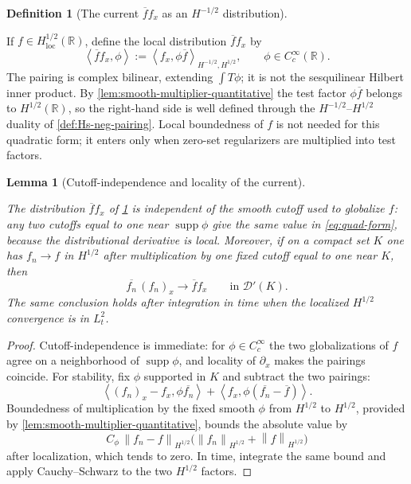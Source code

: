 \documentclass[11pt,oneside]{book}
\providecommand{\uses}[1]{}
\newtheorem{lemma}[theorem]{Lemma}
\theoremstyle{definition}
\newtheorem{definition}[theorem]{Definition}
\theoremstyle{remark}
\newcommand{\R}{\mathbb R}
\newcommand{\D}{\mathcal D}
\newcommand{\1}{\mathbf 1}
\newcommand{\loc}{\mathrm{loc}}
\newcommand{\norm}[1]{\left\lVert #1\right\rVert}
\newcommand{\pair}[2]{\left\langle #1,#2\right\rangle}
\begin{document}
\begin{definition}[The current $\overline f f_x$ as an $H^{-1/2}$ distribution]\label{def:quadratic-form-current}
\uses{def:Hs-neg-pairing, def:multiplier-test-algebra, def:Hs-loc}
If $f\in H^{1/2}_{\loc}(\R)$, define the local distribution $\overline f f_x$ by
\begin{equation}
 \pair{\overline f f_x}{\phi}
 :=\pair{f_x}{\phi\overline f}_{H^{-1/2},H^{1/2}},
 \qquad \phi\in C_c^\infty(\R).
 \label{eq:quad-form}
\end{equation}
The pairing is complex bilinear, extending $\int T\phi$; it is not the sesquilinear Hilbert inner product. By \cref{lem:smooth-multiplier-quantitative} the test factor $\phi\overline f$ belongs to $H^{1/2}(\R)$, so the right-hand side is well defined through the $H^{-1/2}$–$H^{1/2}$ duality of \cref{def:Hs-neg-pairing}. Local boundedness of $f$ is not needed for this quadratic form; it enters only when zero-set regularizers are multiplied into test factors.
\end{definition}

\begin{lemma}[Cutoff-independence and locality of the current]\label{lem:current-locality}
\uses{def:quadratic-form-current, def:Hs-loc}
The distribution $\overline f f_x$ of \cref{def:quadratic-form-current} is independent of the smooth cutoff used to globalize $f$: any two cutoffs equal to one near $\operatorname{supp}\phi$ give the same value in \eqref{eq:quad-form}, because the distributional derivative is local. Moreover, if on a compact set $K$ one has $f_n\to f$ in $H^{1/2}$ after multiplication by one fixed cutoff equal to one near $K$, then
\[
 \overline{f_n}\,(f_n)_x\longrightarrow\overline f f_x
 \qquad\text{in }\D'(K).
\]
The same conclusion holds after integration in time when the localized $H^{1/2}$ convergence is in $L^2_t$.
\end{lemma}

\begin{proof}
\uses{def:quadratic-form-current, lem:smooth-multiplier-quantitative}
Cutoff-independence is immediate: for $\phi\in C_c^\infty$ the two globalizations of $f$ agree on a neighborhood of $\operatorname{supp}\phi$, and locality of $\partial_x$ makes the pairings coincide. For stability, fix $\phi$ supported in $K$ and subtract the two pairings:
\[
 \pair{(f_n)_x-f_x}{\phi\overline{f_n}}
 +\pair{f_x}{\phi(\overline{f_n}-\overline f)}.
\]
Boundedness of multiplication by the fixed smooth $\phi$ from $H^{1/2}$ to $H^{1/2}$, provided by \cref{lem:smooth-multiplier-quantitative}, bounds the absolute value by
\[
 C_\phi\,\norm{f_n-f}_{H^{1/2}}
 \bigl(\norm{f_n}_{H^{1/2}}+\norm{f}_{H^{1/2}}\bigr)
\]
after localization, which tends to zero. In time, integrate the same bound and apply Cauchy–Schwarz to the two $H^{1/2}$ factors.
\end{proof}
\end{document}
